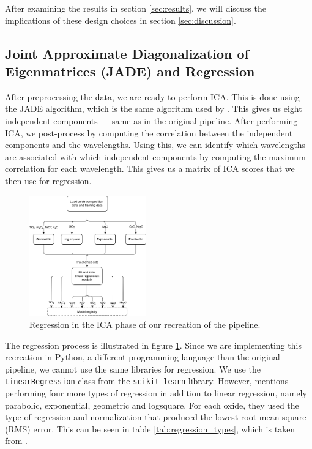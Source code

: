 After examining the results in section \ref{sec:results}, we will discuss the implications of these design choices in section \ref{sec:discussion}.

\subsection{Joint Approximate Diagonalization of Eigenmatrices (JADE) and Regression}
After preprocessing the data, we are ready to perform ICA.
This is done using the JADE algorithm, which is the same algorithm used by \citeauthor{cleggRecalibrationMarsScience2017}.
This gives us eight independent components --- same as in the original pipeline.
After performing ICA, we post-process by computing the correlation between the independent components and the wavelengths.
Using this, we can identify which wavelengths are associated with which independent components by computing the maximum correlation for each wavelength.
This gives us a matrix of ICA scores that we then use for regression.

\begin{figure}
	\centering
	\includegraphics[width=0.45\textwidth]{images/ica_regression.png}
	\caption{Regression in the ICA phase of our recreation of the pipeline.}
	\label{fig:ica_regression}
\end{figure}

The regression process is illustrated in figure \ref{fig:ica_regression}.
Since we are implementing this recreation in Python, a different programming language than the original pipeline, we cannot use the same libraries for regression.
We use the \texttt{LinearRegression} class from the \texttt{scikit-learn} library\cite{scikit-learn}.
However, \citeauthor{cleggRecalibrationMarsScience2017} mentions performing four more types of regression in addition to linear regression, namely parabolic, exponential, geometric and logsquare.
For each oxide, they used the type of regression and normalization that produced the lowest root mean square (RMS) error.
This can be seen in table \ref{tab:regression_types}, which is taken from \citeauthor{cleggRecalibrationMarsScience2017}.

